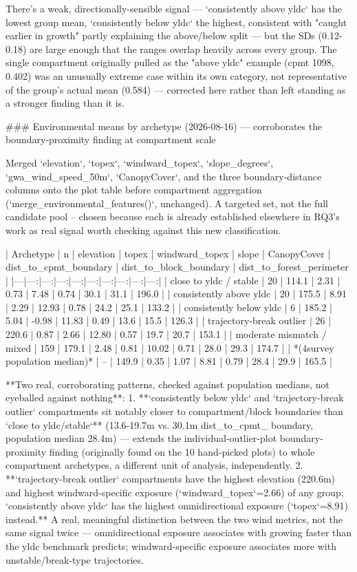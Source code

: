 There's a weak, directionally-sensible signal — `consistently above yldc` has the lowest group mean,
`consistently below yldc` the highest, consistent with "caught earlier in growth" partly explaining
the above/below split — but the SDs (0.12-0.18) are large enough that the ranges overlap heavily
across every group. The single compartment originally pulled as the "above yldc" example (cpmt
1098, 0.402) was an unusually extreme case within its own category, not representative of the
group's actual mean (0.584) — corrected here rather than left standing as a stronger finding than
it is.

### Environmental means by archetype (2026-08-16) — corroborates the boundary-proximity finding at compartment scale

Merged `elevation`, `topex`, `windward_topex`, `slope_degrees`, `gwa_wind_speed_50m`,
`CanopyCover`, and the three boundary-distance columns onto the plot table before compartment
aggregation (`merge_environmental_features()`, unchanged). A targeted set, not the full candidate
pool -- chosen because each is already established elsewhere in RQ3's work as real signal worth
checking against this new classification.

| Archetype | n | elevation | topex | windward_topex | slope | CanopyCover | dist_to_cpmt_boundary | dist_to_block_boundary | dist_to_forest_perimeter |
|---|---:|---:|---:|---:|---:|---:|---:|---:|---:|
| close to yldc / stable | 20 | 114.1 | 2.31 | 0.73 | 7.48 | 0.74 | 30.1 | 31.1 | 196.0 |
| consistently above yldc | 20 | 175.5 | 8.91 | 2.29 | 12.93 | 0.78 | 24.2 | 25.1 | 133.2 |
| consistently below yldc | 6 | 185.2 | 5.04 | -0.98 | 11.83 | 0.49 | 13.6 | 15.5 | 126.3 |
| trajectory-break outlier | 26 | 220.6 | 0.87 | 2.66 | 12.80 | 0.57 | 19.7 | 20.7 | 153.1 |
| moderate mismatch / mixed | 159 | 179.1 | 2.48 | 0.81 | 10.02 | 0.71 | 28.0 | 29.3 | 174.7 |
| *(4survey population median)* | -- | 149.9 | 0.35 | 1.07 | 8.81 | 0.79 | 28.4 | 29.9 | 165.5 |

**Two real, corroborating patterns, checked against population medians, not eyeballed against
nothing**:
1. **`consistently below yldc` and `trajectory-break outlier` compartments sit notably closer to
   compartment/block boundaries than `close to yldc/stable`** (13.6-19.7m vs. 30.1m dist_to_cpmt_
   boundary, population median 28.4m) — extends the individual-outlier-plot boundary-proximity
   finding (originally found on the 10 hand-picked plots) to whole compartment archetypes, a
   different unit of analysis, independently.
2. **`trajectory-break outlier` compartments have the highest elevation (220.6m) and highest
   windward-specific exposure (`windward_topex`=2.66) of any group; `consistently above yldc` has
   the highest omnidirectional exposure (`topex`=8.91) instead.** A real, meaningful distinction
   between the two wind metrics, not the same signal twice — omnidirectional exposure associates
   with growing faster than the yldc benchmark predicts; windward-specific exposure associates more
   with unstable/break-type trajectories.


